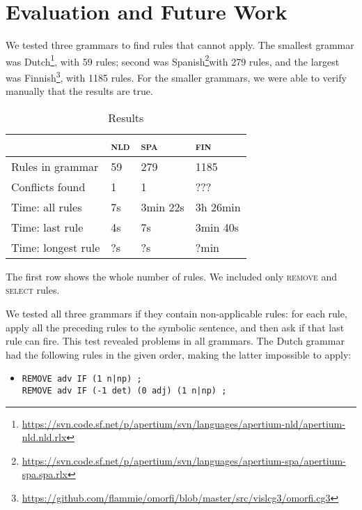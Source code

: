 \section{Evaluation and Future Work}
\label{sec:eval}

We tested three grammars to find rules that cannot apply. The smallest grammar was Dutch\footnote{\url{https://svn.code.sf.net/p/apertium/svn/languages/apertium-nld/apertium-nld.nld.rlx}}, with 59 rules; second was Spanish\footnote{\url{https://svn.code.sf.net/p/apertium/svn/languages/apertium-spa/apertium-spa.spa.rlx}}with 279 rules, and the largest was Finnish\footnote{\url{https://github.com/flammie/omorfi/blob/master/src/vislcg3/omorfi.cg3}}, with 1185 rules.
For the smaller grammars, we were able to verify manually that the results are true.

\begin{table}[]
\centering
\begin{tabular}{|l|l|l|l|}
\hline
                      & \textsc{nld}  & \textsc{spa}  & \textsc{fin}  \\ \hline
Rules in grammar      & 59              & 279               & 1185     \\ \hline
Conflicts found       & 1               & 1                 & ???    \\ \hline
Time: all rules       & 7s              & 3min 22s          & 3h 26min    \\ \hline
Time: last rule       & 4s              & 7s                & 3min 40s    \\ \hline
Time: longest rule    & ?s              & ?s                & ?min     \\ \hline

\end{tabular}
\caption{Results}
\label{table:res}
\end{table}

The first row shows the whole number of rules. We included only \textsc{remove} and \textsc{select} rules.

We tested all three grammars if they contain non-applicable rules:
for each rule, apply all the preceding rules to the symbolic sentence, and then ask if that last rule can fire.
This test revealed problems in all grammars.
The Dutch grammar had the following rules in the given order, making the latter impossible to apply:

\begin{itemize}
\item[] 
\begin{verbatim}REMOVE adv IF (1 n|np) ;
REMOVE adv IF (-1 det) (0 adj) (1 n|np) ;
\end{verbatim}
\end{itemize}

